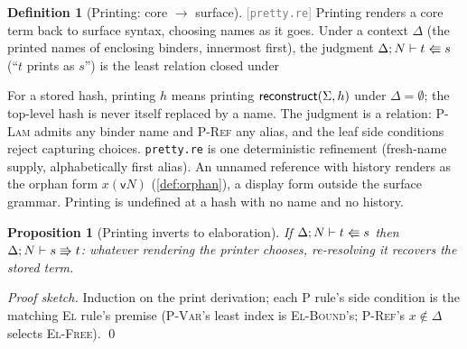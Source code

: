 \documentclass[11pt]{article}
\theoremstyle{definition}
\newtheorem{definition}{Definition}[section]
\theoremstyle{plain}
\newtheorem{proposition}[theorem]{Proposition}
\theoremstyle{remark}
\newcommand{\src}[1]{{\footnotesize\textcolor{gray}{[\texttt{#1}]}}}
\begin{document}
\begin{definition}[Printing: core $\to$ surface]\label{def:print}
\src{pretty.re} Printing renders a core term back to surface syntax, choosing names as it goes.
Under a context $\Delta$ (the printed names of enclosing binders, innermost first), the
judgment $\Delta;N \vdash t \Lleftarrow s$ (``$t$ prints as $s$'') is the least relation
closed under
For a stored hash, printing $h$ means printing $\mathsf{reconstruct}(\Sigma,h)$ under
$\Delta = \emptyset$; the top-level hash is never itself replaced by a name. The judgment is a
relation: \textsc{P-Lam} admits any binder name and \textsc{P-Ref} any alias, and the leaf side
conditions reject capturing choices. \texttt{pretty.re} is one deterministic refinement
(fresh-name supply, alphabetically first alias). An unnamed reference with history renders as
the orphan form $x(\mathsf{v}N)$ (\cref{def:orphan}), a display form outside the surface
grammar. Printing is undefined at a hash with no name and no history.
\end{definition}

\begin{proposition}[Printing inverts to elaboration]\label{prop:print-elab}
If $\Delta;N \vdash t \Lleftarrow s$ then $\Delta;N \vdash s \Rrightarrow t$:
whatever rendering the printer chooses, re-resolving it recovers the stored term.
\end{proposition}
\begin{proof}[Proof sketch]
Induction on the print derivation; each \textsc{P} rule's side condition is the matching
\textsc{El} rule's premise (\textsc{P-Var}'s least index is \textsc{El-Bound}'s;
\textsc{P-Ref}'s $x \notin \Delta$ selects \textsc{El-Free}). \qed
\end{proof}
\end{document}
